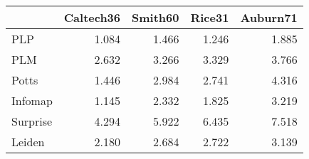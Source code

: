 \begin{tabular}{lrrrr}
\toprule
{} & Caltech36 & Smith60 & Rice31 & Auburn71 \\
\midrule
PLP      &     1.084 &   1.466 &  1.246 &    1.885 \\
PLM      &     2.632 &   3.266 &  3.329 &    3.766 \\
Potts    &     1.446 &   2.984 &  2.741 &    4.316 \\
Infomap  &     1.145 &   2.332 &  1.825 &    3.219 \\
Surprise &     4.294 &   5.922 &  6.435 &    7.518 \\
Leiden   &     2.180 &   2.684 &  2.722 &    3.139 \\
\bottomrule
\end{tabular}
